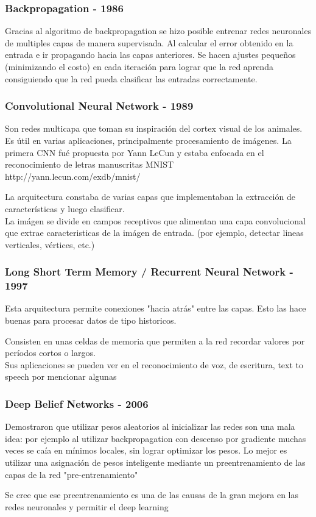 \documentclass[
	11pt, %
]{beamer}
\begin{document}
\begin{frame}
  \frametitle{Backpropagation - 1986}

  Gracias al algoritmo de backpropagation se hizo posible entrenar redes neuronales de multiples capas de manera supervisada. Al calcular el error obtenido en la entrada e ir propagando hacia las capas anteriores. Se hacen ajustes pequeños (minimizando el costo) en cada iteración para lograr que la red aprenda consiguiendo que la red pueda clasificar las entradas correctamente.
  
  
\end{frame}

\begin{frame}
  \frametitle{Convolutional Neural Network - 1989}

  Son redes multicapa que toman su inspiración del cortex visual de los animales. Es útil en varias aplicaciones, principalmente \alert{procesamiento de imágenes}. La primera CNN fué propuesta por Yann LeCun y estaba enfocada en el reconocimiento de letras manuscritas MNIST http://yann.lecun.com/exdb/mnist/ 
  
  \bigskip %

  La arquitectura constaba de varias capas que implementaban la extracción de características y luego clasificar.\\
  La imágen se divide en campos receptivos que alimentan una capa convolucional que extrae caracteristicas de la imágen de entrada. (por ejemplo, detectar lineas verticales, vértices, etc.)
  
\end{frame}

\begin{frame}
  \frametitle{Long Short Term Memory / Recurrent Neural Network - 1997}

  Esta arquitectura permite conexiones "hacia atrás" entre las capas. Esto las hace buenas para procesar datos de tipo historicos.
  
  \bigskip %

  Consisten en unas celdas de memoria que permiten a la red recordar valores por períodos cortos o largos.\\
  Sus aplicaciones se pueden ver en el reconocimiento de voz, de escritura, text to speech por mencionar algunas
\end{frame}

\begin{frame}
  \frametitle{Deep Belief Networks - 2006}

  Demostraron que utilizar pesos aleatorios al inicializar las redes son una mala idea: por ejemplo al utilizar backpropagation con descenso por gradiente muchas veces se caía en mínimos locales, sin lograr optimizar los pesos. Lo mejor es utilizar una asignación de pesos inteligente mediante un preentrenamiento de las capas de la red "pre-entrenamiento"
  
  \bigskip %

  Se cree que ese preentrenamiento es una de las causas de la gran mejora en las redes neuronales y permitir el deep learning
  
\end{frame}
\end{document}
